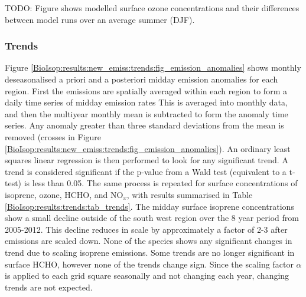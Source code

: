       
      TODO: Figure shows modelled surface ozone concentrations and their differences between model runs over an average summer (DJF). 
      
    
    \subsubsection{Trends}
    \label{BioIsop:results:new_emiss:trends}
    
      Figure \ref{BioIsop:results:new_emiss:trends:fig_emission_anomalies} shows monthly deseasonalised a priori and a posteriori midday emission anomalies for each region.
      First the emissions are spatially averaged within each region to form a daily time series of midday emission rates
      This is averaged into monthly data, and then the multiyear monthly mean is subtracted to form the anomaly time series.
      Any anomaly greater than three standard deviations from the mean is removed (crosses in Figure \ref{BioIsop:results:new_emiss:trends:fig_emission_anomalies}).
      An ordinary least squares linear regression is then performed to look for any significant trend.
      A trend is considered significant if the p-value from a Wald test (equivalent to a t-test) is less than 0.05.
      The same process is repeated for surface concentrations of isoprene, ozone, HCHO, and NO$_x$, with results summarised in Table \ref{BioIsop:results:trends:tab_trends}.
      The midday surface isoprene concentrations show a small decline outside of the south west region over the 8 year period from 2005-2012.
      This decline reduces in scale by approximately a factor of 2-3 after emissions are scaled down.
      None of the species shows any significant changes in trend due to scaling isoprene emissions.
      Some trends are no longer significant in surface HCHO, however none of the trends change sign.
      Since the scaling factor $\alpha$ is applied to each grid square seasonally and not changing each year, changing trends are not expected.
      
